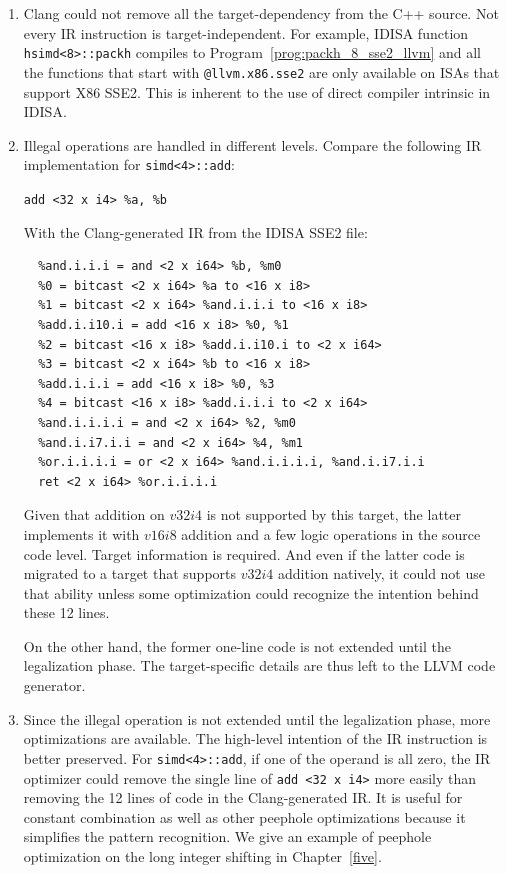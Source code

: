 \begin{enumerate}
    \item Clang could not remove all the target-dependency from the C++ source. Not every IR instruction is target-independent. For example, IDISA function {\tt hsimd<8>::packh} compiles to Program~\ref{prog:packh_8_sse2_llvm} and all the functions that start with {\tt @llvm.x86.sse2} are only available on ISAs that support X86 SSE2. This is inherent to the use of direct compiler intrinsic in IDISA.
    \newpage

    \item Illegal operations are handled in different levels. Compare the following IR implementation for {\tt simd<4>::add}:
      \begin{center}
        \verb|add <32 x i4> %a, %b|
      \end{center}
    With the Clang-generated IR from the IDISA SSE2 file:
      \begin{center}
        \begin{verbatim}
  %and.i.i.i = and <2 x i64> %b, %m0
  %0 = bitcast <2 x i64> %a to <16 x i8>
  %1 = bitcast <2 x i64> %and.i.i.i to <16 x i8>
  %add.i.i10.i = add <16 x i8> %0, %1
  %2 = bitcast <16 x i8> %add.i.i10.i to <2 x i64>
  %3 = bitcast <2 x i64> %b to <16 x i8>
  %add.i.i.i = add <16 x i8> %0, %3
  %4 = bitcast <16 x i8> %add.i.i.i to <2 x i64>
  %and.i.i.i.i = and <2 x i64> %2, %m0
  %and.i.i7.i.i = and <2 x i64> %4, %m1
  %or.i.i.i.i = or <2 x i64> %and.i.i.i.i, %and.i.i7.i.i
  ret <2 x i64> %or.i.i.i.i
        \end{verbatim}
      \end{center}

    Given that addition on $v32i4$ is not supported by this target, the latter implements it with $v16i8$ addition and a few logic operations in the source code level. Target information is required. And even if the latter code is migrated to a target that supports $v32i4$ addition natively, it could not use that ability unless some optimization could recognize the intention behind these 12 lines.

    On the other hand, the former one-line code is not extended until the legalization phase. The target-specific details are thus left to the LLVM code generator.

    \item Since the illegal operation is not extended until the legalization phase, more optimizations are available. The high-level intention of the IR instruction is better preserved. For {\tt simd<4>::add}, if one of the operand is all zero, the IR optimizer could remove the single line of \verb|add <32 x i4>| more easily than removing the 12 lines of code in the Clang-generated IR\@. It is useful for constant combination as well as other peephole optimizations because it simplifies the pattern recognition. We give an example of peephole optimization on the long integer shifting in Chapter~\ref{five}.
\end{enumerate}

